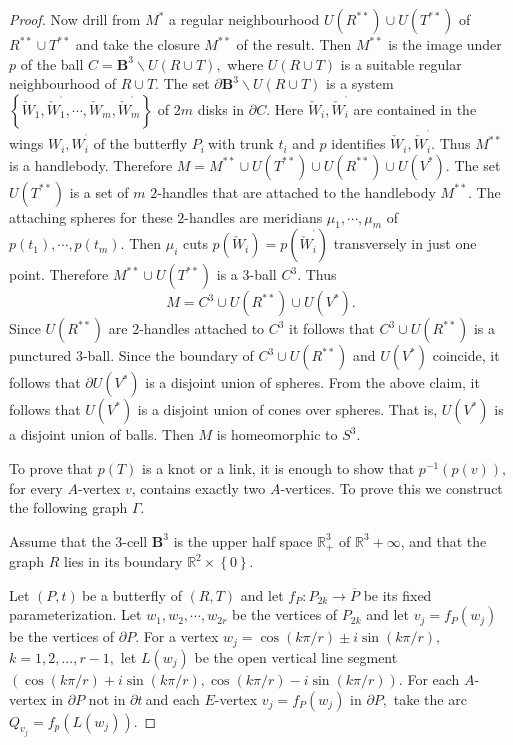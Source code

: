 \documentclass{amsproc}\usepackage{eurosym}
\theoremstyle{plain}
\numberwithin{equation}{section}
\begin{document}
\begin{proof}
Now drill from $M^{\ast}$ a regular neighbourhood $U(R^{\ast\ast})\cup
U\left(  T^{\ast\ast}\right)  $ of $R^{\ast\ast}\cup T^{\ast\ast}$ and take
the closure $M^{\ast\ast}$ of the result. Then $M^{\ast\ast}$ is the image
under $p$ of the ball $C=\mathbf{B}^{3}\smallsetminus U\left(  R\cup T\right)
,$ where $U\left(  R\cup T\right)  $ is a suitable regular neighbourhood of
$R\cup T.$ The set $\partial\mathbf{B}^{3}\smallsetminus U\left(  R\cup
T\right)  $ is a system $\left\{  \check{W}_{1},\check{W}_{1}^{^{\prime}},\cdots,\check{W}_{m},\check{W}_{m}^{^{\prime}}\right\}  $ of $2m$ disks in
$\partial C.$ Here $\check{W}_{i},\check{W}_{i}^{^{\prime}} $ are contained in
the wings $W_{i},W_{i}^{^{\prime}}$ of the butterfly $P_{i}\ $with trunk
$t_{i}$ and $p$ identifies $\check{W}_{i},\check{W}_{i}^{^{\prime}}$. Thus
$M^{\ast\ast}$ is a handlebody. Therefore $M=M^{\ast\ast}\cup U\left(
T^{\ast\ast}\right)  \cup U(R^{\ast\ast})\cup U(V^{\ast}).$ The set $U\left(
T^{\ast\ast}\right)  $ is a set of $m $ $2$-handles that are attached to the
handlebody $M^{\ast\ast}.$ The attaching spheres for these $2$-handles are
meridians $\mu_{1},\cdots,\mu_{m}$ of $p\left(  t_{1}\right)  ,\cdots,p\left(
t_{m}\right)  $. Then $\mu_{i}$ cuts $p\left(  \check{W}_{i}\right)  =p\left(
\check{W}_{i}^{^{\prime}}\right)  $ transversely in just one point. Therefore
$M^{\ast\ast}\cup U\left(  T^{\ast\ast}\right)  $ is a $3$-ball $C^{3}$. Thus
\[
M=C^{3}\cup U(R^{\ast\ast})\cup U(V^{\ast}).
\]
Since $U(R^{\ast\ast})$ are $2$-handles attached to $C^{3}$ it follows that
$C^{3}\cup U(R^{\ast\ast})$ is a punctured $3$-ball. Since the boundary of
$C^{3}\cup U(R^{\ast\ast})$ and $U(V^{\ast})$ coincide, it follows that
$\partial U(V^{\ast})$ is a disjoint union of spheres. From the above claim,
it follows that $U(V^{\ast})$ is a disjoint union of cones over spheres. That
is, $U(V^{\ast})$ is a disjoint union of balls. Then $M$ is homeomorphic to
$S^{3}.$

To prove that $p\left(  T\right)  $ is a knot or a link, it is enough to show
that $p^{-1}(p(v)),$ for every $A$-vertex $v$, contains exactly two
$A$-vertices. To prove this we construct the following graph $\Gamma.$

Assume that the $3$-cell $\mathbf{B}^{3}$ is the upper half space
$\mathbb{R}_{+}^{3}$ of $\mathbb{R}^{3}+\infty$, and that the graph $R$ lies
in its boundary $\mathbb{R}^{2}\times\left\{  0\right\}  .$

Let $(P,t)\ $be a butterfly of $(R,T)$ and let $f_{P}:P_{2k}\rightarrow
\overline{P}$ be its fixed parameterization. Let $w_{1},w_{2},\cdots,w_{2r}$
be the vertices of $P_{2k}$ and let $v_{j}=f_{P}(w_{j})$ be the vertices of
$\partial P$. For a vertex $w_{j}=\cos(k\pi/r)\pm i\sin(k\pi/r),$
$k=1,2,...,r-1,$ let $L(w_{j})$ be the open vertical line segment $(\cos
(k\pi/r)+i\sin(k\pi/r),\cos(k\pi/r)-i\sin(k\pi/r)).$ For each $A$-vertex in
$\partial P$ not in $\partial t\ $and each $E$-vertex $v_{j}=f_{P}(w_{j})$ in
$\partial P,$ take the arc $Q_{v_{j}}=f_{p}(L(w_{j})). $


\end{proof}
\end{document}
